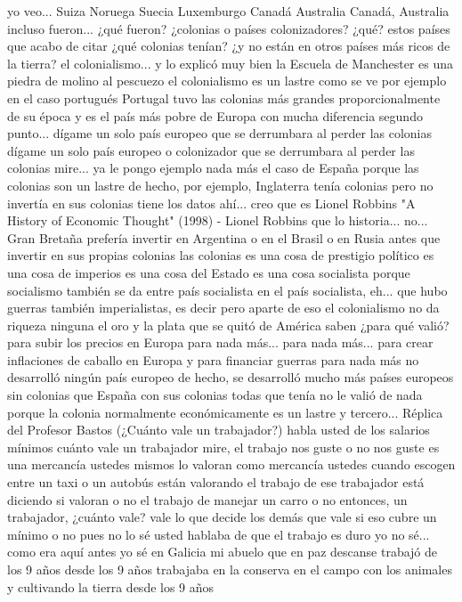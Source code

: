 yo veo... Suiza Noruega
Suecia Luxemburgo Canadá
Australia Canadá, Australia incluso fueron... ¿qué fueron? ¿colonias o países colonizadores?
¿qué? estos países que acabo de citar ¿qué colonias tenían?
¿y no están en otros países más ricos de la tierra? el colonialismo...
y lo explicó muy bien la Escuela de Manchester es una piedra de molino al pescuezo el colonialismo es un lastre como se ve por ejemplo en el caso portugués
Portugal tuvo las colonias más grandes proporcionalmente de su época y es el país más pobre de Europa con mucha diferencia
segundo punto... dígame un solo país europeo que se derrumbara al perder las colonias
dígame un solo país europeo o colonizador que se derrumbara al perder las colonias mire...
ya le pongo ejemplo nada más el caso de España porque las colonias son un lastre de hecho, por ejemplo, Inglaterra
tenía colonias pero no invertía en sus colonias tiene los datos ahí... creo que es Lionel Robbins
"A History of Economic Thought" (1998) - Lionel Robbins
que lo historia... no... Gran Bretaña prefería invertir en Argentina o en el Brasil
o en Rusia antes que invertir en sus propias colonias las colonias es una cosa de prestigio político es una cosa de imperios es una cosa del Estado
es una cosa socialista porque socialismo también se da entre país socialista
en el país socialista, eh... que hubo guerras también imperialistas, es decir pero aparte de eso el colonialismo no da riqueza ninguna
el oro y la plata que se quitó de América saben ¿para qué valió? para subir los precios en Europa para nada más...
para nada más... para crear inflaciones de caballo en Europa y para financiar guerras para nada más no desarrolló ningún país europeo
de hecho, se desarrolló mucho más países europeos sin colonias que España con sus colonias todas que tenía
no le valió de nada porque la colonia normalmente económicamente es un lastre y tercero...
Réplica del Profesor Bastos (¿Cuánto vale un trabajador?)
habla usted de los salarios mínimos cuánto vale un trabajador mire, el trabajo nos guste o no nos guste
es una mercancía ustedes mismos lo valoran como mercancía ustedes cuando escogen entre un taxi
o un autobús están valorando el trabajo de ese trabajador está diciendo si valoran o no el trabajo de manejar un carro o no
entonces, un trabajador, ¿cuánto vale? vale lo que decide los demás que vale si eso cubre un mínimo o no
pues no lo sé usted hablaba de que el trabajo es duro yo no sé... como era aquí antes yo sé en Galicia mi abuelo
que en paz descanse trabajó de los 9 años desde los 9 años trabajaba en la conserva
en el campo con los animales y cultivando la tierra desde los 9 años
